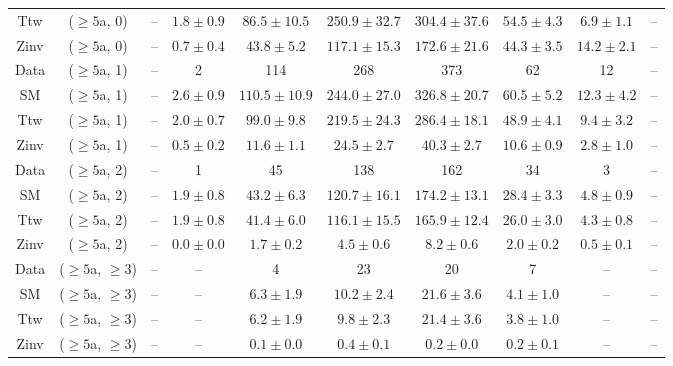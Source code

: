 \begin{table}[h!]
{\begin{tabular}{cccccccccc}
	Ttw & ($\ge5$a, 0) & -- & $1.8\pm 0.9$ & $86.5\pm 10.5$ & $250.9\pm 32.7$ & $304.4\pm 37.6$ & $54.5\pm 4.3$ & $6.9\pm 1.1$ & -- \\[0.5ex] 
	Zinv & ($\ge5$a, 0) & -- & $0.7\pm 0.4$ & $43.8\pm 5.2$ & $117.1\pm 15.3$ & $172.6\pm 21.6$ & $44.3\pm 3.5$ & $14.2\pm 2.1$ & -- \\[0.5ex] 
	Data & ($\ge5$a, 1) & -- & 2 & 114 & 268 & 373 & 62 & 12 & -- \\[0.5ex] 
	SM & ($\ge5$a, 1) & -- & $2.6\pm 0.9$ & $110.5\pm 10.9$ & $244.0\pm 27.0$ & $326.8\pm 20.7$ & $60.5\pm 5.2$ & $12.3\pm 4.2$ & -- \\[0.5ex] 
	Ttw & ($\ge5$a, 1) & -- & $2.0\pm 0.7$ & $99.0\pm 9.8$ & $219.5\pm 24.3$ & $286.4\pm 18.1$ & $48.9\pm 4.1$ & $9.4\pm 3.2$ & -- \\[0.5ex] 
	Zinv & ($\ge5$a, 1) & -- & $0.5\pm 0.2$ & $11.6\pm 1.1$ & $24.5\pm 2.7$ & $40.3\pm 2.7$ & $10.6\pm 0.9$ & $2.8\pm 1.0$ & -- \\[0.5ex] 
	Data & ($\ge5$a, 2) & -- & 1 & 45 & 138 & 162 & 34 & 3 & -- \\[0.5ex] 
	SM & ($\ge5$a, 2) & -- & $1.9\pm 0.8$ & $43.2\pm 6.3$ & $120.7\pm 16.1$ & $174.2\pm 13.1$ & $28.4\pm 3.3$ & $4.8\pm 0.9$ & -- \\[0.5ex] 
	Ttw & ($\ge5$a, 2) & -- & $1.9\pm 0.8$ & $41.4\pm 6.0$ & $116.1\pm 15.5$ & $165.9\pm 12.4$ & $26.0\pm 3.0$ & $4.3\pm 0.8$ & -- \\[0.5ex] 
	Zinv & ($\ge5$a, 2) & -- & $0.0\pm 0.0$ & $1.7\pm 0.2$ & $4.5\pm 0.6$ & $8.2\pm 0.6$ & $2.0\pm 0.2$ & $0.5\pm 0.1$ & -- \\[0.5ex] 
	Data & ($\ge5$a, $\ge3$) & -- & -- & 4 & 23 & 20 & 7 & -- & -- \\[0.5ex] 
	SM & ($\ge5$a, $\ge3$) & -- & -- & $6.3\pm 1.9$ & $10.2\pm 2.4$ & $21.6\pm 3.6$ & $4.1\pm 1.0$ & -- & -- \\[0.5ex] 
	Ttw & ($\ge5$a, $\ge3$) & -- & -- & $6.2\pm 1.9$ & $9.8\pm 2.3$ & $21.4\pm 3.6$ & $3.8\pm 1.0$ & -- & -- \\[0.5ex] 
	Zinv & ($\ge5$a, $\ge3$) & -- & -- & $0.1\pm 0.0$ & $0.4\pm 0.1$ & $0.2\pm 0.0$ & $0.2\pm 0.1$ & -- & -- \\[0.5ex] 
	\hline
	\hline
\end{tabular}}
\end{table}
